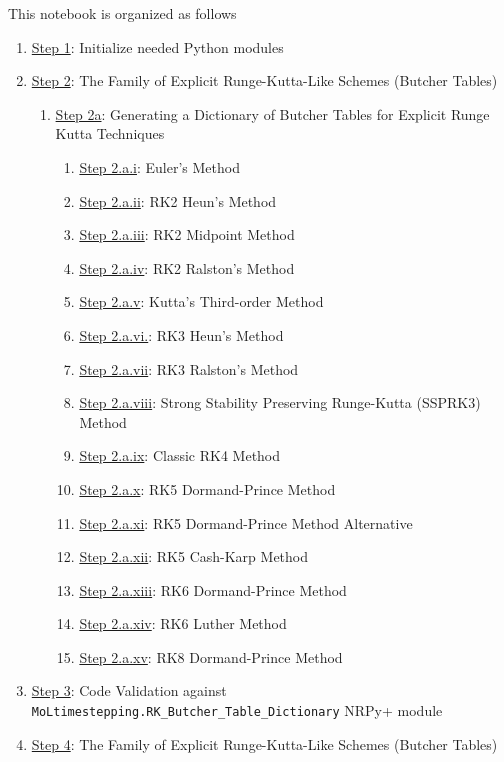 \documentclass[landscape,letterpaper,10pt,english]{article}
\providecommand{\tightlist}{%
      \setlength{\itemsep}{0pt}\setlength{\parskip}{0pt}}
\begin{document}
This notebook is organized as follows

\begin{enumerate}
\def\labelenumi{\arabic{enumi}.}
\tightlist
\item
  \hyperref[initializenrpy]{Step 1}: Initialize needed Python modules
\item
  \hyperref[introbutcher]{Step 2}: The Family of Explicit
  Runge-Kutta-Like Schemes (Butcher Tables)

  \begin{enumerate}
  \def\labelenumii{\arabic{enumii}.}
  \tightlist
  \item
    \hyperref[codebutcher]{Step 2a}: Generating a Dictionary of Butcher
    Tables for Explicit Runge Kutta Techniques

    \begin{enumerate}
    \def\labelenumiii{\arabic{enumiii}.}
    \tightlist
    \item
      \hyperref[euler]{Step 2.a.i}: Euler's Method
    \item
      \hyperref[rktwoheun]{Step 2.a.ii}: RK2 Heun's Method
    \item
      \hyperref[rk2mp]{Step 2.a.iii}: RK2 Midpoint Method
    \item
      \hyperref[rk2ralston]{Step 2.a.iv}: RK2 Ralston's Method
    \item
      \hyperref[rk3]{Step 2.a.v}: Kutta's Third-order Method
    \item
      \hyperref[rk3heun]{Step 2.a.vi.}: RK3 Heun's Method
    \item
      \hyperref[rk3ralston]{Step 2.a.vii}: RK3 Ralston's Method
    \item
      \hyperref[ssprk3]{Step 2.a.viii}: Strong Stability Preserving
      Runge-Kutta (SSPRK3) Method
    \item
      \hyperref[rkfour]{Step 2.a.ix}: Classic RK4 Method
    \item
      \hyperref[dp5]{Step 2.a.x}: RK5 Dormand-Prince Method
    \item
      \hyperref[dp5alt]{Step 2.a.xi}: RK5 Dormand-Prince Method
      Alternative
    \item
      \hyperref[ck5]{Step 2.a.xii}: RK5 Cash-Karp Method
    \item
      \hyperref[dp6]{Step 2.a.xiii}: RK6 Dormand-Prince Method
    \item
      \hyperref[l6]{Step 2.a.xiv}: RK6 Luther Method
    \item
      \hyperref[dp8]{Step 2.a.xv}: RK8 Dormand-Prince Method
    \end{enumerate}
  \end{enumerate}
\item
  \hyperref[code_validation]{Step 3}: Code Validation against
  \texttt{MoLtimestepping.RK\_Butcher\_Table\_Dictionary} NRPy+ module
\item
  \hyperref[introbutchera]{Step 4}: The Family of Explicit
  Runge-Kutta-Like Schemes (Butcher Tables)


\end{enumerate}
\end{document}
